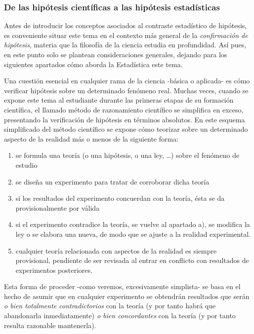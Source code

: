 \documentclass[
]{article}
\providecommand{\tightlist}{%
  \setlength{\itemsep}{0pt}\setlength{\parskip}{0pt}}
\begin{document}
\subsubsection{De las hipótesis científicas a las hipótesis estadísticas}\label{de-las-hipuxf3tesis-cientuxedficas-a-las-hipuxf3tesis-estaduxedsticas}

Antes de introducir los conceptos asociados al contraste estadístico de hipótesis, es conveniente situar este tema en el contexto más general de la \emph{confirmación de hipótesis}, materia que la filosofía de la ciencia estudia en profundidad. Así pues, en este punto solo se plantean consideraciones generales, dejando para los siguientes apartados cómo aborda la Estadística este tema.

Una cuestión esencial en cualquier rama de la ciencia -básica o aplicada- es cómo verificar hipótesis sobre un determinado fenómeno real. Muchas veces, cuando se expone este tema al estudiante durante las primeras etapas de su formación científica, el llamado método de razonamiento científico se simplifica en exceso, presentando la verificación de hipótesis en términos absolutos. En este esquema simplificado del método científico se expone cómo teorizar sobre un determinado aspecto de la realidad más o menos de la siguiente forma:

\begin{enumerate}
\def\labelenumi{\alph{enumi})}
\tightlist
\item
  se formula una teoría (o una hipótesis, o una ley, \ldots) sobre el fenómeno de estudio\\
\item
  se diseña un experimento para tratar de corroborar dicha teoría\\
\item
  si los resultados del experimento concuerdan con la teoría, ésta se da provisionalmente por válida\\
\item
  si el experimento contradice la teoría, se vuelve al apartado a), se modifica la ley o se elabora una nueva, de modo que se ajuste a la realidad experimental.\\
\item
  cualquier teoría relacionada con aspectos de la realidad es siempre provisional, pendiente de ser revisada al entrar en conflicto con resultados de experimentos posteriores.
\end{enumerate}

Esta forma de proceder -como veremos, excesivamente simplista- se basa en el hecho de asumir que en cualquier experimento se obtendrán resultados que serán \emph{o bien totalmente contradictorios} con la teoría (y por tanto habrá que abandonarla inmediatamente) \emph{o bien concordantes} con la teoría (y por tanto resulta razonable mantenerla).
\end{document}
